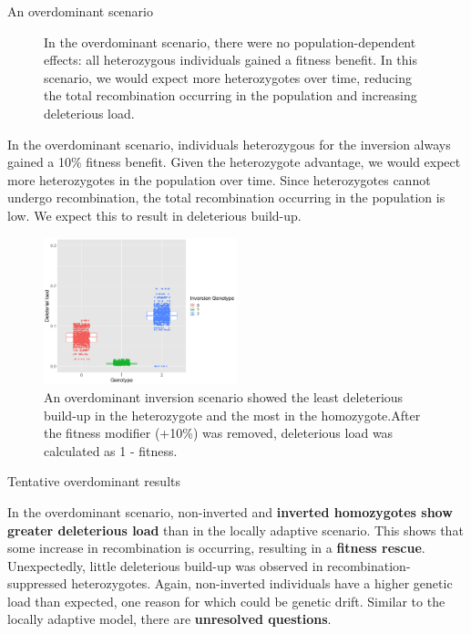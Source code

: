 \documentclass[final]{beamer}
\newlength{\colwidth}
\begin{document}
\begin{frame}[t]
\begin{columns}[t]
\begin{column}{\colwidth}
\begin{block}{An overdominant scenario}
\begin{figure}
\begin{minipage}[c]{0.67\textwidth}
          \end{minipage}\hfill
          \caption{
            In the overdominant scenario, there were no population-dependent effects: all heterozygous individuals gained a fitness benefit. In this scenario, we would expect more heterozygotes over time, reducing the total recombination occurring in the population and increasing deleterious load.
            }
    \end{figure}

    In the overdominant scenario, individuals heterozygous for the inversion always gained a 10\% fitness benefit. Given the heterozygote advantage, we would expect more heterozygotes in the population over time. Since heterozygotes cannot undergo recombination, the total recombination occurring in the population is low. We expect this to result in deleterious build-up.

    \begin{figure}
    \centering
                \includegraphics[width=0.5\textwidth]{figures/od_load_100kgen.png}
    \caption{An overdominant inversion scenario showed the least deleterious build-up in the heterozygote and the most in the homozygote.After the fitness modifier (+10\%) was removed, deleterious load was calculated as 1 - fitness. }
    \end{figure}

    \end{block}

    \begin{exampleblock}{Tentative overdominant results}

    In the overdominant scenario, non-inverted and \textbf{inverted homozygotes show greater deleterious load} than in the locally adaptive scenario. This shows that some increase in recombination is occurring, resulting in a \textbf{fitness rescue}. Unexpectedly, little deleterious build-up was observed in recombination-suppressed heterozygotes. Again, non-inverted individuals have a higher genetic load than expected, one reason for which could be genetic drift. Similar to the locally adaptive model, there are \textbf{unresolved questions}.




\end{exampleblock}
\end{column}
\end{columns}
\end{frame}
\end{document}
